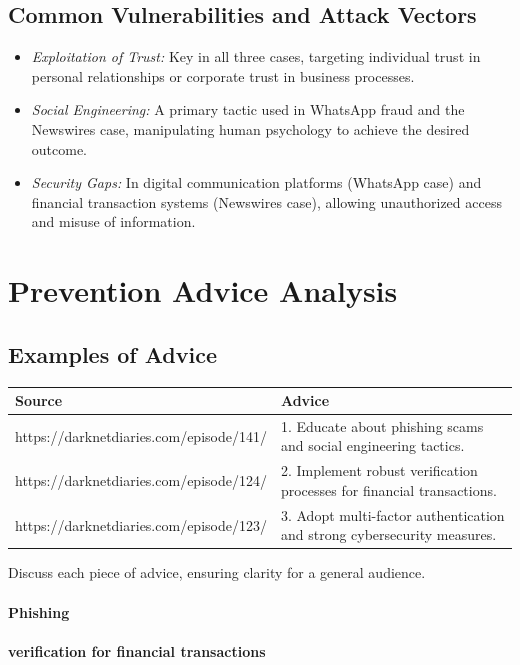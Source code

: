 \documentclass[11pt]{article}
\begin{document}
\subsection{Common Vulnerabilities and Attack Vectors}
\begin{itemize}
    \item \textit{Exploitation of Trust:} Key in all three cases, targeting individual trust in personal relationships or corporate trust in business processes.    
    \item \textit{Social Engineering:} A primary tactic used in WhatsApp fraud and the Newswires case, manipulating human psychology to achieve the desired outcome.
    \item \textit{Security Gaps:} In digital communication platforms (WhatsApp case) and financial transaction systems (Newswires case), allowing unauthorized access and misuse of information.
\end{itemize}

\section{Prevention Advice Analysis}
\subsection{Examples of Advice}
\begin{tabular}{@{}ll@{}}
\toprule
\textbf{Source} & \textbf{Advice} \\ \midrule
https://darknetdiaries.com/episode/141/ & 1. Educate about phishing scams and social engineering tactics. \\ 
https://darknetdiaries.com/episode/124/ & 2. Implement robust verification processes for financial transactions. \\
https://darknetdiaries.com/episode/123/ & 3. Adopt multi-factor authentication and strong cybersecurity measures. \\
\bottomrule
\end{tabular}

Discuss each piece of advice, ensuring clarity for a general audience.
\paragraph*{Phishing}
\paragraph*{verification for financial transactions}
\end{document}
